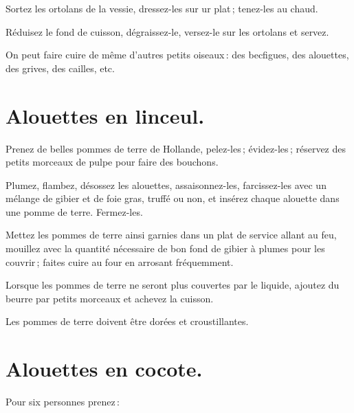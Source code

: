 Sortez les ortolans de la vessie, dressez-les sur ur plat ; tenez-les au chaud.

Réduisez le fond de cuisson, dégraissez-le, versez-le sur les ortolans et
servez.

\sk

On peut faire cuire de même d'autres petits oiseaux : des becfigues, des
alouettes, des grives, des cailles, etc.

\section*{\centering Alouettes en linceul.}
{}

Prenez de belles pommes de terre de Hollande, pelez-les ; évidez-les ; réservez
des petits morceaux de pulpe pour faire des bouchons.

Plumez, flambez, désossez les alouettes, assaisonnez-les, farcissez-les avec un
mélange de gibier et de foie gras, truffé ou non, et insérez chaque alouette
dans une pomme de terre. Fermez-les.

Mettez les pommes de terre ainsi garnies dans un plat de service allant au feu,
mouillez avec la quantité nécessaire de bon fond de gibier à plumes pour les
couvrir ; faites cuire au four en arrosant fréquemment.

Lorsque les pommes de terre ne seront plus couvertes par le liquide, ajoutez
du beurre par petits morceaux et achevez la cuisson.

Les pommes de terre doivent être dorées et croustillantes.

\section*{\centering Alouettes en cocote.}
{}

Pour six personnes prenez :

\medskip

